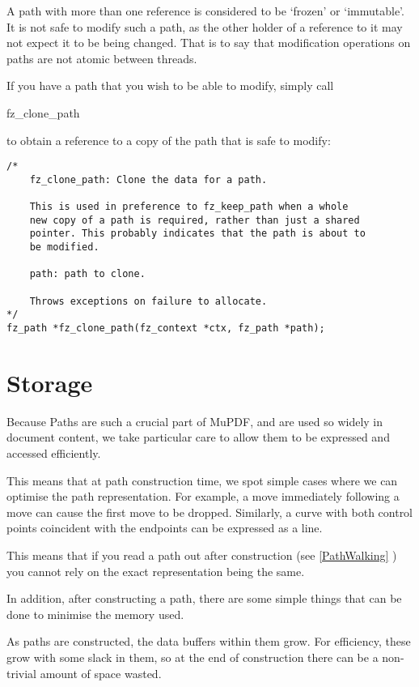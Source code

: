 \documentclass[oneside]{book}
\newcommand{\rjwref}[1] {\autoref{#1} \nameref{#1}}
\begin{document}
A path with more than one reference is considered to be `frozen' or `immutable'. It is not safe to modify such a path, as the other holder of a reference to it may not expect it to be being changed. That is to say that modification operations on paths are not atomic between threads.

If you have a path that you wish to be able to modify, simply call \begin{tt}fz\_clone\_path\end{tt} to obtain a reference to a copy of the path that is safe to modify:

\begin{lstlisting}
/*
	fz_clone_path: Clone the data for a path.

	This is used in preference to fz_keep_path when a whole
	new copy of a path is required, rather than just a shared
	pointer. This probably indicates that the path is about to
	be modified.

	path: path to clone.

	Throws exceptions on failure to allocate.
*/
fz_path *fz_clone_path(fz_context *ctx, fz_path *path);
\end{lstlisting}

\section{Storage}

Because Paths are such a crucial part of MuPDF, and are used so widely in document content, we take particular care to allow them to be expressed and accessed efficiently.

This means that at path construction time, we spot simple cases where we can optimise the path representation. For example, a move immediately following a move can cause the first move to be dropped. Similarly, a curve with both control points coincident with the endpoints can be expressed as a line.

This means that if you read a path out after construction (see \rjwref{PathWalking}) you cannot rely on the exact representation being the same.

In addition, after constructing a path, there are some simple things that can be done to minimise the memory used.

As paths are constructed, the data buffers within them grow. For efficiency, these grow with some slack in them, so at the end of construction there can be a non-trivial amount of space wasted.
\end{document}
